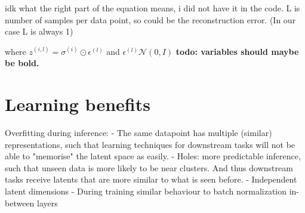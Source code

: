 


idk what the right part of the equation means, i did not have it in the code. L is number of samples per data point, so could be the reconstruction error. (In our case L is always 1)

where $z^(i,l) = \sigma ^{(i)} \odot \epsilon^{(l)}$ and $\epsilon^(l) \mathcal{N}(0, I)$
\textbf{todo: variables should maybe be bold.}


%
%






\section{Learning benefits}
Overfitting during inference:
- The same datapoint has multiple (similar) representations, such that learning techniques for downstream tasks will not be able to "memorise" the latent space as easily.
- Holes: more predictable inference, such that unseen data is more likely to be near clusters. And thus downstream tasks receive latents that are more similar to what is seen before.
- Independent latent dimensions
- During training similar behaviour to batch normalization in-between layers


